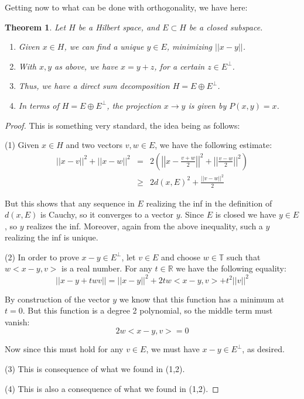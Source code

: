 \documentclass[12pt]{amsbook}
\newtheorem{theorem}{Theorem}[chapter]
\begin{document}
\bigskip

Getting now to what can be done with orthogonality, we have here:

\begin{theorem}
Let $H$ be a Hilbert space, and $E\subset H$ be a closed subspace.
\begin{enumerate}
\item Given $x\in H$, we can find a unique $y\in E$, minimizing $||x-y||$.

\item With $x,y$ as above, we have $x=y+z$, for a certain $z\in E^\perp$.

\item Thus, we have a direct sum decomposition $H=E\oplus E^\perp$.

\item In terms of $H=E\oplus E^\perp$, the projection $x\to y$ is given by $P(x,y)=x$.
\end{enumerate}
\end{theorem}

\begin{proof}
This is something very standard, the idea being as follows:

\medskip

(1) Given $x\in H$ and two vectors $v,w\in E$, we have the following estimate:
\begin{eqnarray*}
||x-v||^2+||x-w||^2
&=&2\left(\left|\left|x-\frac{v+w}{2}\right|\right|^2+\left|\left|\frac{v-w}{2}\right|\right|^2\right)\\
&\geq&2d(x,E)^2+\frac{||v-w||^2}{2}
\end{eqnarray*}

But this shows that any sequence in $E$ realizing the inf in the definition of $d(x,E)$ is Cauchy, so it converges to a vector $y$. Since $E$ is closed we have $y\in E$, so $y$ realizes the inf. Moreover, again from the above inequality, such a $y$ realizing the inf is unique.

\medskip

(2) In order to prove $x-y\in E^\perp$, let $v\in E$ and choose $w\in\mathbb T$ such that $w<x-y,v>$ is a real number. For any $t\in\mathbb R$ we have the following equality:
$$||x-y+twv||=||x-y||^2+2tw<x-y,v>+t^2||v||^2$$

By construction of the vector $y$ we know that this function has a minimum at $t=0$. But this function is a degree 2 polynomial, so the middle term must vanish:
$$2w<x-y,v>=0$$

Now since this must hold for any $v\in E$, we must have $x-y\in E^\perp$, as desired.

\medskip

(3) This is consequence of what we found in (1,2).

\medskip

(4) This is also a consequence of what we found in (1,2).
\end{proof}
\end{document}

